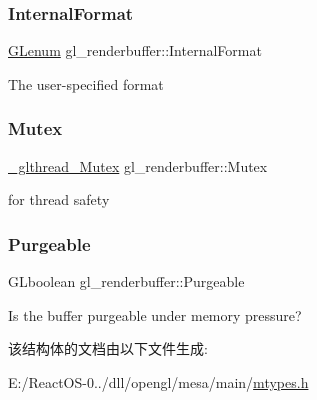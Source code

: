 \subsubsection{\texorpdfstring{Internal\+Format}{InternalFormat}}
{\footnotesize\ttfamily \hyperlink{interfacevoid}{G\+Lenum} gl\+\_\+renderbuffer\+::\+Internal\+Format}

The user-\/specified format \mbox{\label{structgl__renderbuffer_a279c62ac954364ce78084a5434829cc2}} 
\subsubsection{\texorpdfstring{Mutex}{Mutex}}
{\footnotesize\ttfamily \hyperlink{struct___c_r_i_t_i_c_a_l___s_e_c_t_i_o_n}{\+\_\+glthread\+\_\+\+Mutex} gl\+\_\+renderbuffer\+::\+Mutex}

for thread safety \mbox{\label{structgl__renderbuffer_af109a1d51c0b1b78925b6381ce162abb}} 
\subsubsection{\texorpdfstring{Purgeable}{Purgeable}}
{\footnotesize\ttfamily G\+Lboolean gl\+\_\+renderbuffer\+::\+Purgeable}

Is the buffer purgeable under memory pressure? 

该结构体的文档由以下文件生成\+:\begin{DoxyCompactItemize}
\item 
E\+:/\+React\+O\+S-\/0../dll/opengl/mesa/main/\hyperlink{mtypes_8h}{mtypes.\+h}\end{DoxyCompactItemize}
